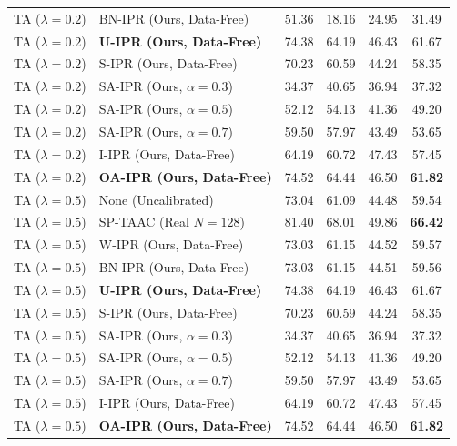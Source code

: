 \documentclass{article}
\begin{document}
\begin{table}[t]
\begin{center}
\begin{footnotesize}
\begin{sc}
\begin{tabular}{llcccc}
TA ($\lambda = 0.2$) & BN-IPR (Ours, Data-Free) & 51.36 & 18.16 & 24.95 & 31.49 \\
TA ($\lambda = 0.2$) & \textbf{U-IPR (Ours, Data-Free)} & 74.38 & 64.19 & 46.43 & 61.67 \\
TA ($\lambda = 0.2$) & S-IPR (Ours, Data-Free) & 70.23 & 60.59 & 44.24 & 58.35 \\
TA ($\lambda = 0.2$) & SA-IPR (Ours, $\alpha = 0.3$) & 34.37 & 40.65 & 36.94 & 37.32 \\
TA ($\lambda = 0.2$) & SA-IPR (Ours, $\alpha = 0.5$) & 52.12 & 54.13 & 41.36 & 49.20 \\
TA ($\lambda = 0.2$) & SA-IPR (Ours, $\alpha = 0.7$) & 59.50 & 57.97 & 43.49 & 53.65 \\
TA ($\lambda = 0.2$) & I-IPR (Ours, Data-Free) & 64.19 & 60.72 & 47.43 & 57.45 \\
TA ($\lambda = 0.2$) & \textbf{OA-IPR (Ours, Data-Free)} & 74.52 & 64.44 & 46.50 & \textbf{61.82} \\
\midrule
TA ($\lambda = 0.5$) & None (Uncalibrated) & 73.04 & 61.09 & 44.48 & 59.54 \\
TA ($\lambda = 0.5$) & SP-TAAC (Real $N=128$) & 81.40 & 68.01 & 49.86 & \textbf{66.42} \\
TA ($\lambda = 0.5$) & W-IPR (Ours, Data-Free) & 73.03 & 61.15 & 44.52 & 59.57 \\
TA ($\lambda = 0.5$) & BN-IPR (Ours, Data-Free) & 73.03 & 61.15 & 44.51 & 59.56 \\
TA ($\lambda = 0.5$) & \textbf{U-IPR (Ours, Data-Free)} & 74.38 & 64.19 & 46.43 & 61.67 \\
TA ($\lambda = 0.5$) & S-IPR (Ours, Data-Free) & 70.23 & 60.59 & 44.24 & 58.35 \\
TA ($\lambda = 0.5$) & SA-IPR (Ours, $\alpha = 0.3$) & 34.37 & 40.65 & 36.94 & 37.32 \\
TA ($\lambda = 0.5$) & SA-IPR (Ours, $\alpha = 0.5$) & 52.12 & 54.13 & 41.36 & 49.20 \\
TA ($\lambda = 0.5$) & SA-IPR (Ours, $\alpha = 0.7$) & 59.50 & 57.97 & 43.49 & 53.65 \\
TA ($\lambda = 0.5$) & I-IPR (Ours, Data-Free) & 64.19 & 60.72 & 47.43 & 57.45 \\
TA ($\lambda = 0.5$) & \textbf{OA-IPR (Ours, Data-Free)} & 74.52 & 64.44 & 46.50 & \textbf{61.82} \\
\bottomrule
\end{tabular}
\end{sc}
\end{footnotesize}
\end{center}
\vskip -0.1in
\end{table}
\end{document}
